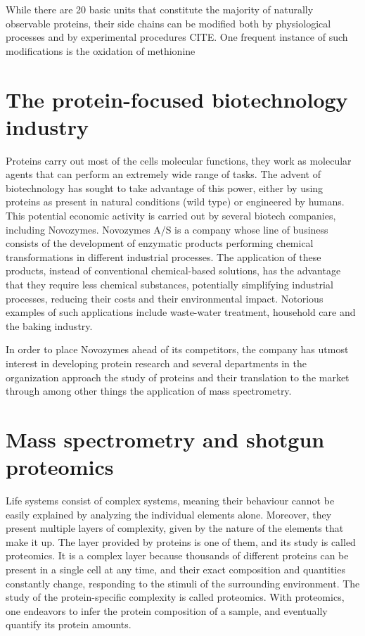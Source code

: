 \documentclass[11pt, a4paper]{report}
\begin{document}
While there are 20 basic units that constitute the majority of naturally observable proteins, their side chains can be modified both by physiological processes and by experimental procedures CITE. One frequent instance of such modifications is the oxidation of methionine


\section{The protein-focused biotechnology industry}


Proteins carry out most of the cell\textquotesingle s molecular functions, they work as molecular agents that can perform an extremely wide range of tasks. The advent of biotechnology has sought to take advantage of this power, either by using proteins as present in natural conditions (wild type) or engineered by humans. This potential economic activity is carried out by several biotech companies, including Novozymes.
 Novozymes A/S is a company whose line of business consists of the development of enzymatic products performing chemical transformations in different industrial processes. The application of these products, instead of conventional chemical-based solutions, has the advantage that they require less chemical substances, potentially simplifying industrial processes, reducing their costs and their environmental impact. Notorious examples of such applications include waste-water treatment, household care and the baking industry.

In order to place Novozymes ahead of its competitors, the company has utmost interest in developing protein research and several departments in the organization approach the study of proteins and their translation to the market through among other things the application of mass spectrometry.



\section{Mass spectrometry and shotgun proteomics}

Life systems consist of complex systems, meaning their behaviour cannot be easily explained by analyzing the individual elements alone. Moreover, they present multiple layers of complexity, given by the nature of the elements that make it up. The layer provided by proteins is one of them, and its study is called proteomics. It is a complex layer because thousands of different proteins can be present in a single cell at any time, and their exact composition and quantities constantly change, responding to the stimuli of the surrounding environment. The study of the protein-specific complexity is called proteomics. With proteomics, one endeavors to infer the protein composition of a sample, and eventually quantify its protein amounts.
\end{document}
